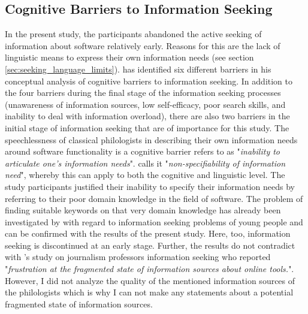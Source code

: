 \documentclass[12pt, a4paper, titlepage, oneside, abstract=true, toc=listof, toc=bibliography, BCOR=1cm]{scrreprt}
\begin{document}
{\subsection*{Cognitive Barriers to Information Seeking}
In the present study, the participants abandoned the active seeking of information about software relatively early. Reasons for this are the lack of linguistic means to express their own information needs (see section \ref{sec:seeking_language_limits}). \citet{Savolainen2015a} has identified six different barriers in his conceptual analysis of cognitive barriers to information seeking. In addition to the four barriers during the final stage of the information seeking processes (unawareness of information sources, low self-efficacy, poor search skills, and inability to deal with information overload), there are also two barriers in the initial stage of information seeking that are of importance for this study. The speechlessness of classical philologists in describing their own information needs around software functionality is a cognitive barrier \citet[p. 616]{Savolainen2015a} refers to as "\textit{inability to articulate one's information needs}". \citet[p. 137]{Belkin1980} calls it "\textit{non-specifiability of information need}", whereby this can apply to both the cognitive and linguistic level.  The study participants justified their inability to specify their information needs by referring to their poor domain knowledge \citep[p. 619]{Savolainen2015a} in the field of software. The problem of finding suitable keywords on that very domain knowledge has already been investigated by \citet[p. 285]{Shenton2012} with regard to information seeking problems of young people and can be confirmed with the results of the present study. Here, too, information seeking is discontinued at an early stage. Further, the results do not contradict with \citeauthor{Hepworth2017}'s \citeyear{Hepworth2017} study on journalism professors information seeking who reported "\textit{frustration at the fragmented state of information sources about online tools.}". However, I did not analyze the quality of the mentioned information sources of the philologists which is why I can not make any statements about a potential fragmented state of information sources.

}
\end{document}
